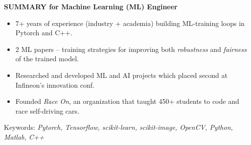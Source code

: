 \documentclass[11pt]{article}
\begin{document}
\begin{tcolorbox}[enhanced, boxrule=0.5pt, colback=white, top=6mm, bottom=4mm, right=5mm, left=5mm, arc=0mm, leftrule=0mm, rightrule=0mm]
    {\large 
    \textbf{\Large SUMMARY for Machine Learning (ML) Engineer }
    \begin{itemize}[left=0pt]
    \item 7+ years of experience (industry + academia) building ML-training loops in Pytorch and C++.
    \item 2 ML papers -- training strategies for improving both \textit{robustness} and \textit{fairness} of the trained model.
    \item Researched and developed ML and AI projects which placed second at Infineon's innovation conf.
    \item Founded \textit{Race On}, an organization that taught 450+ students to code and race self-driving cars.
    \end{itemize}

    {\normalsize Keywords: \textit{Pytorch, Tensorflow, scikit-learn, scikit-image, OpenCV, Python, Matlab, C++}}
    
       
    }

\end{tcolorbox}
\end{document}
